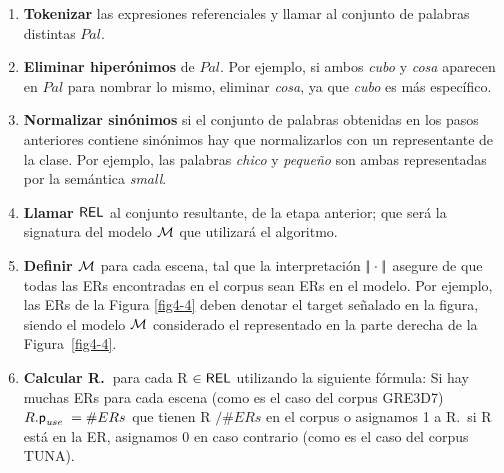 \begin{enumerate}
\item \textbf{Tokenizar} las expresiones referenciales y llamar al conjunto de palabras distintas
 $Pal$. %

\item \textbf{Eliminar hiper\'onimos} de $Pal$. Por ejemplo, si ambos \emph{cubo} y
  \emph{cosa} aparecen en $Pal$ para nombrar lo mismo, eliminar \emph{cosa}, ya que \emph{cubo} es m\'as espec\'ifico.

\item \textbf{Normalizar sin\'onimos} si el conjunto de palabras obtenidas en los pasos anteriores contiene
  sin\'onimos hay que normalizarlos con un representante de la clase. Por ejemplo, las palabras \emph{chico}
  y \emph{peque\~no} son ambas representadas por la sem\'antica \emph{small}.

\item \textbf{Llamar $\textsf{REL}$} al conjunto resultante, de la etapa anterior; que ser\'a la signatura del modelo $\mathcal{M}$ que utilizar\'a el algoritmo.

\item \textbf{Definir $\mathcal{M}$} para cada escena, tal que la interpretaci\'on
 $|\!|\cdot|\!|$ asegure de que todas las ERs encontradas en el corpus sean ERs en
  el modelo. Por ejemplo, las ERs de la Figura \ref{fig4-4} deben denotar el target se\~nalado en la figura, siendo el modelo 
$\mathcal{M}$ considerado el representado en la parte derecha de la Figura~\ref{fig4-4}.
\item \textbf{Calcular R.\puse\ }para cada R $\in \textsf{REL}$ utilizando la siguiente f\'ormula: Si
  hay muchas ERs para cada escena (como es el caso del corpus GRE3D7) $R.\textsf{p}_\textit{use}\ = \#ERs$ que tienen R $/\#ERs$ en el corpus o asignamos 1 a R.\puse \ si R est\'a en la ER, asignamos 0 en caso contrario (como es el caso del corpus TUNA).
\end{enumerate}

